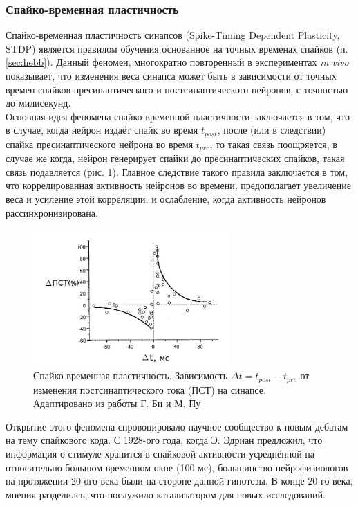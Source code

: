 \documentclass[a4paper,10pt]{article}
\begin{document}
\subsubsection{Спайко-временная пластичность}\label{sec:stdp}
\indent Спайко-временная пластичность синапсов (Spike-Timing Dependent Plasticity, STDP) является правилом обучения основанное на точных временах спайков (п. \ref{sec:hebb}). Данный феномен, многократно повторенный в экспериментах \textit{in vivo} показывает, что изменения веса синапса может быть в зависимости от точных времен спайков пресинаптического и постсинаптического нейронов, с точностью до милисекунд.\\
\indent Основная идея феномена спайко-временной пластичности заключается в том, что в случае, когда нейрон издаёт спайк во время $t_{post}$, после (или в следствии) спайка пресинаптического нейрона во время $t_{pre}$, то такая связь поощряется, в случае же когда, нейрон генерирует спайки до пресинаптических спайков, такая связь подавляется (рис. \ref{stdp_pic}). Главное следствие такого правила заключается в том, что коррелированная активность нейронов во времени, предополагает увеличение веса и усиление этой корреляции, и ослабление, когда активность нейронов рассинхронизирована.\\
\begin{figure}[ht]
\centering
\captionsetup{justification=centering,margin=1cm}
\includegraphics[width=75mm,scale=0.7]{stdp.jpg}
\caption{Спайко-временная пластичность. Зависимость $\Delta t = t_{post} - t_{pre}$ от изменения постсинаптического тока (ПСТ) на синапсе. Адаптировано из работы Г. Би и М. Пу \cite{stdp4} }
\label{stdp_pic}
\end{figure}
\FloatBarrier
\indent Открытие этого феномена спровоцировало научное сообщество к новым дебатам на тему спайкового кода. С 1928-ого года, когда Э. Эдриан \cite{rate_first} предложил, что информация о стимуле хранится в спайковой активности усреднённой на относительно большом временном окне (100 мс), большинство нейрофизиологов на протяжении 20-ого века были на стороне данной гипотезы. В конце 20-го века, мнения разделилсь, что послужило катализатором для новых исследований.\\
\end{document}

